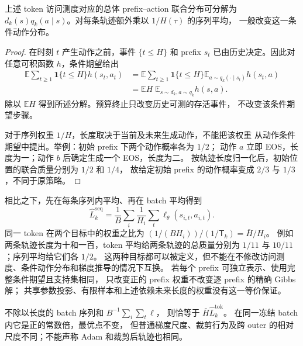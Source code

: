 \documentclass[lang=cn,scheme=chinese,openany]{../book/elegantbook}
\begin{document}
\begin{proposition}[访问测度与条件动作分布]
上述 token 访问测度对应的总体 prefix--action 联合分布可分解为
$d_k(s) q_k(a\mid s)$。对每条轨迹额外乘以 $1/H(\tau)$ 的序列平均，
一般改变这一条件动作分布。
\end{proposition}
\begin{proof}
在时刻 $t$ 产生动作之前，事件 $\{t\le H\}$ 和 prefix $s_t$
已由历史决定。因此对任意可积函数 $h$，条件期望给出
\begin{align}
 \mathbb E\sum_{t\ge1}\mathbf1\{t\le H\}h(s_t,a_t)
 &=\mathbb E\sum_{t\ge1}\mathbf1\{t\le H\}
 \mathbb E_{a\sim q_k(\cdot\mid s_t)}h(s_t,a)\\
 &=\mathbb E H\;\mathbb E_{s\sim d_k,a\sim q_k}h(s,a).
\end{align}
除以 $\mathbb E H$ 得到所述分解。预算终止只改变历史可测的存活事件，
不改变该条件期望步骤。

对于序列权重 $1/H$，长度取决于当前及未来生成动作，不能把该权重
从动作条件期望中提出。举例：初始 prefix 下两个动作概率各为 $1/2$；
动作 $a$ 立即 EOS，长度为一；动作 $b$ 后确定生成一个 EOS，长度为二。
按轨迹长度归一化后，初始位置的联合质量分别为 $1/2$ 和 $1/4$，
故给定初始 prefix 的动作概率变成 $2/3$ 与 $1/3$，不同于原策略。
\end{proof}

相比之下，先在每条序列内平均、再在 batch 平均得到
\begin{equation}
 \widehat L_k^{\mathrm{seq}}=
 \frac1B\sum_i\frac1{H_i}\sum_t\ell_\theta(s_{i,t},a_{i,t}).
\end{equation}
同一 token 在两个目标中的权重之比为
$(1/(BH_i))/(1/\mathsf T_k)=\bar H/H_i$。
例如两条轨迹长度为十和一百，token 平均给两条轨迹的总质量分别为
$1/11$ 与 $10/11$；序列平均给它们各 $1/2$。
这两种目标都可以被定义，但不能在不修改访问测度、条件动作分布和梯度推导的情况下互换。
若每个 prefix 可独立表示、使用完整条件期望且支持集相同，
只改变正的 prefix 权重不改变逐 prefix 的精确 Gibbs 解；
共享参数投影、有限样本和上述依赖未来长度的权重没有这一等价保证。

不除以长度的 batch 序列和 $B^{-1}\sum_i\sum_t\ell$，
则恰等于 $\bar H\widehat L_k^{\mathrm{tok}}$。
在同一冻结 batch 内它是正的常数倍，最优点不变，
但普通梯度尺度、裁剪行为及跨 outer 的相对尺度不同；不能声称 Adam 和裁剪后轨迹也相同。
\end{document}
